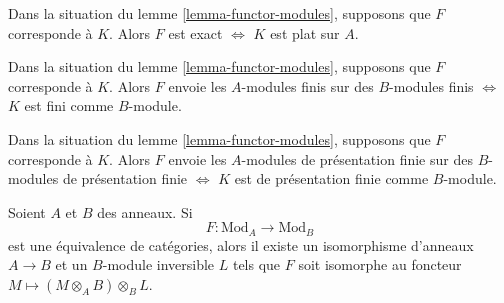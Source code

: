 \begin{remark}
\label{remark-exact-flat}
Dans la situation du lemme \ref{lemma-functor-modules},
supposons que $F$ corresponde à $K$. Alors
$F$ est exact $\Leftrightarrow$ $K$ est plat sur $A$.
\end{remark}

\begin{remark}
\label{remark-finite}
Dans la situation du lemme \ref{lemma-functor-modules},
supposons que $F$ corresponde à $K$. Alors
$F$ envoie les $A$-modules finis sur des $B$-modules finis
$\Leftrightarrow$ $K$ est fini comme $B$-module.
\end{remark}

\begin{remark}
\label{remark-finite-presentation}
Dans la situation du lemme \ref{lemma-functor-modules},
supposons que $F$ corresponde à $K$. Alors
$F$ envoie les $A$-modules de présentation finie sur des $B$-modules de présentation finie
$\Leftrightarrow$ $K$ est de présentation finie comme $B$-module.
\end{remark}

\begin{lemma}
\label{lemma-functor-equivalence}
Soient $A$ et $B$ des anneaux. Si
$$
F : \text{Mod}_A \longrightarrow \text{Mod}_B
$$
est une équivalence de catégories, alors il existe un isomorphisme
d'anneaux $A \to B$ et un $B$-module inversible $L$ tels que
$F$ soit isomorphe au foncteur $M \mapsto (M \otimes_A B) \otimes_B L$.
\end{lemma}

